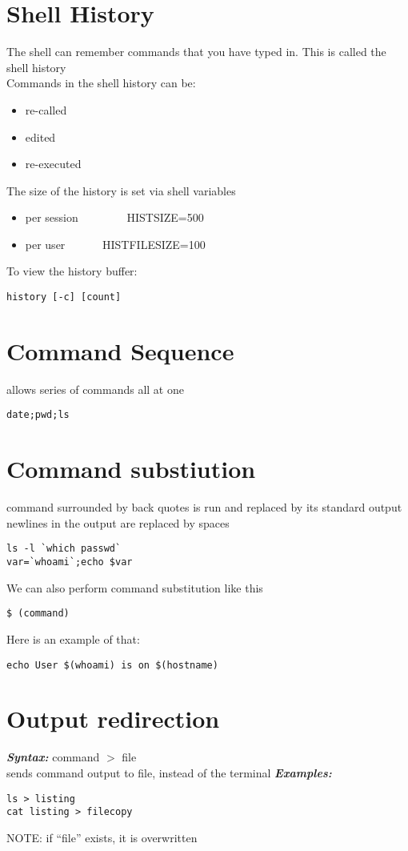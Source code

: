 \documentclass{report}
\begin{document}
\section{Shell History}
The shell can remember commands that you have typed in. This is called the shell history \\
Commands in the shell history can be:
\begin{itemize}
  \item re-called
  \item edited
  \item re-executed
 \end{itemize}
 The size of the history is set via shell variables 
 \begin{itemize}
   \item per session \ \ \ \ \ \ \ \ HISTSIZE=500 
   \item per user \ \ \ \ \ \ HISTFILESIZE=100
\end{itemize}
To view the history buffer:
\begin{verbatim}
history [-c] [count]
\end{verbatim}
\section{Command Sequence}
allows series of commands all at one
\begin{verbatim}
date;pwd;ls
\end{verbatim}
\section{Command substiution}
command surrounded by back quotes is run and replaced by its standard output
\bigbreak \noindent
newlines in the output are replaced by spaces
\begin{verbatim}
ls -l `which passwd`
var=`whoami`;echo $var
\end{verbatim}
We can also perform command substitution like this
\begin{verbatim}
$ (command)
\end{verbatim}
Here is an example of that:
\begin{verbatim}
echo User $(whoami) is on $(hostname)
\end{verbatim}
\section{Output redirection}
\textit{\textbf{Syntax:}} command $>$ file \\
sends command output to file, instead of the terminal
\bigbreak \noindent
\textit{\textbf{Examples:}}
\begin{verbatim}
ls > listing
cat listing > filecopy
\end{verbatim}
\vspace{1.5mm}
\noindent
  NOTE: if ``file'' exists, it is overwritten
\newpage
\end{document}
